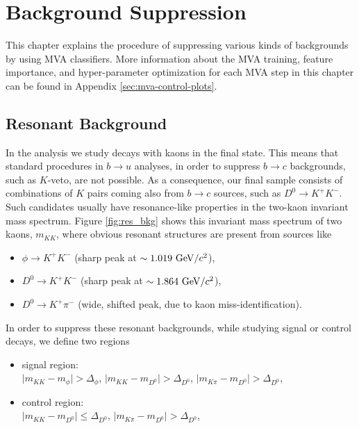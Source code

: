 \chapter{Background Suppression}\label{sec:background-suppression}

This chapter explains the procedure of suppressing various kinds of backgrounds by using MVA classifiers. More information about the MVA training, feature importance, and hyper-parameter optimization for each MVA step in this chapter can be found in Appendix \ref{sec:mva-control-plots}.

\section{Resonant Background}
\label{sec:res_bkg}

In the analysis we study decays with kaons in the final state. This means that standard procedures in $b \to u$ analyses, in order to suppress $b \to c$ backgrounds, such as $K$-veto, are not possible. As a consequence, our final sample consists of combinations of $K$ pairs coming also from $b \to c$  sources, such as $D^0 \to K^+ K^-$. Such candidates usually have resonance-like properties in the two-kaon invariant mass spectrum. Figure \ref{fig:res_bkg} shows this invariant mass spectrum of two kaons, $m_{KK}$, where obvious resonant structures are present from sources like
\begin{itemize}
	\item $\phi \to K^+K^-$ (sharp peak at $\sim1.019\mathrm{~GeV}/c^2$),
	\item $D^0 \to K^+K^-$ (sharp peak at $\sim 1.864\mathrm{~GeV}/c^2$),
	\item $D^0 \to K^+ \pi^-$ (wide, shifted peak, due to kaon miss-identification).
\end{itemize}

In order to suppress these resonant backgrounds, while studying signal or control decays, we define two regions
\begin{itemize}
	\item signal region:\\$\vert m_{KK} - m_{\phi} \vert > \Delta_\phi$, $\vert m_{KK} - m_{D^0} \vert > \Delta_{D^0}$, $\vert m_{K\pi} - m_{D^0} \vert > \Delta_{D^0}$,
	\item control region:\\$\vert m_{KK} - m_{D^0} \vert \leq \Delta_{D^0}$, $\vert m_{K\pi} - m_{D^0} \vert > \Delta_{D^0}$,
\end{itemize}

